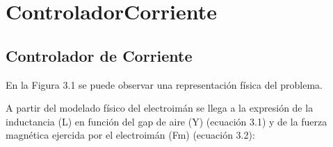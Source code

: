\chapter{ControladorCorriente}  \label{cap:ControladorCorriente}

\section{Controlador de Corriente}

En la Figura 3.1 se puede observar una representación física del problema.


A partir del modelado físico del electroimán se llega a la expresión de la inductancia (L) en función del gap de aire (Y) (ecuación 3.1) y de la fuerza magnética ejercida por el electroimán (Fm) (ecuación 3.2):


